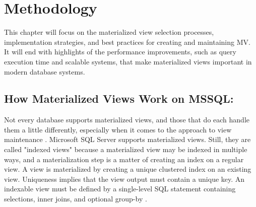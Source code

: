 \section{Methodology}\vspace{.4cm}
This chapter will focus on the materialized view selection processes, implementation strategies, and best practices for creating and maintaining MV. It will end with highlights of the performance improvements, such as query execution time and scalable systems, that make materialized views important in modern database systems.

 \subsection{How Materialized Views Work on MSSQL:} Not every database supports materialized views, and those that do each handle them a little differently, especially when it comes to the approach to view maintenance \cite{hattemer-2020}. Microsoft SQL Server supports materialized views. Still, they are called "indexed views" because a materialized view may be indexed in multiple ways, and a materialization step is a matter of creating an index on a regular view. A view is materialized by creating a unique clustered index on an existing view. Uniqueness implies that the view output must contain a unique key. An indexable view must be defined by a single-level SQL statement containing selections, inner joins, and optional group-by \cite{goldstein-2001}.\vspace{0.8cm}

